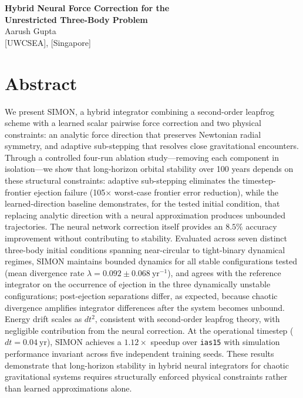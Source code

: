 \documentclass[12pt]{article}
\begin{document}
\newpage
{}
\setcounter{page}{1}
\thispagestyle{plain}

\begin{center}
  {\Large \textbf{Hybrid Neural Force Correction for the\\[0.2cm]
   Unrestricted Three-Body Problem}}\\[0.8cm]
  {\large Aarush Gupta}\\[0.3cm]
  {\small [UWCSEA], [Singapore]}\\[1cm]
\end{center}

\section*{Abstract}

We present SIMON, a hybrid integrator combining a second-order leapfrog scheme with a learned scalar pairwise force correction and two physical constraints: an analytic force direction that preserves Newtonian radial symmetry, and adaptive sub-stepping that resolves close gravitational encounters. Through a controlled four-run ablation study---removing each component in isolation---we show that long-horizon orbital stability over 100 years depends on these structural constraints: adaptive sub-stepping eliminates the timestep-frontier ejection failure (105$\times$ worst-case frontier error
reduction), while the learned-direction baseline demonstrates, for the tested initial condition, that replacing analytic direction with a neural approximation produces unbounded trajectories. The neural network correction itself provides an $8.5\%$ accuracy improvement without contributing to stability. Evaluated across seven distinct three-body initial conditions spanning near-circular to tight-binary dynamical regimes, SIMON maintains bounded dynamics for all stable configurations tested (mean divergence rate $\lambda = 0.092 \pm 0.068\ \mathrm{yr}^{-1}$), and agrees with the reference integrator on the occurrence of ejection in the three
dynamically unstable configurations; post-ejection separations differ, as expected, because
chaotic divergence amplifies integrator differences after the system becomes unbound. Energy drift scales as $dt^2$, consistent with second-order leapfrog theory, with negligible contribution from the neural correction. At the operational timestep ($dt = 0.04\ \mathrm{yr}$), SIMON achieves a $1.12\times$ speedup over \texttt{ias15} with simulation performance invariant across five independent training seeds. These results demonstrate that long-horizon stability in hybrid neural integrators for chaotic gravitational systems requires structurally enforced physical constraints rather than learned approximations alone.
\end{document}
